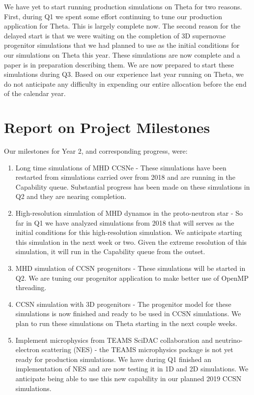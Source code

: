 \documentclass[12pt,titlepage]{article}
\begin{document}
We have yet to start running production simulations on Theta for two reasons. 
First, during Q1 we spent some effort continuing to tune our production application for Theta. 
This is largely complete now.
The second reason for the delayed start is that we were waiting on the completion of 3D supernovae progenitor simulations that we had planned to use as the initial conditions for our simulations on Theta this year.
These simulations are now complete and a paper is in preparation describing them. 
We are now prepared to start these simulations during Q3. 
Based on our experience last year running on Theta, we do not anticipate any difficulty in expending our entire allocation before the end of the calendar year.

\section{Report on Project Milestones}

Our milestones for Year 2, and corresponding progress, were:
\begin{enumerate}
    \item Long time simulations of MHD CCSNe - These simulations have been restarted from simulations carried over from 2018 and are running in the Capability queue. Substantial progress has been made on these simulations in Q2 and they are nearing completion.
    \item High-resolution simulation of MHD dynamos in the proto-neutron star - So far in Q1 we have analyzed simulations from 2018 that will serves as the initial conditions for this high-resolution simulation. We anticipate starting this simulation in the next week or two. Given the extreme resolution of this simulation, it will run in the Capability queue from the outset.
    \item MHD simulation of CCSN progenitors - These simulations will be started in Q2. We are tuning our progenitor application to make better use of OpenMP threading.
    \item CCSN simulation with 3D progenitors - The progenitor model for these simulations is now finished and ready to be used in CCSN simulations. We plan to run these simulations on Theta starting in the next couple weeks.
    \item Implement microphysics from TEAMS SciDAC collaboration and neutrino-electron scattering (NES) - the TEAMS microphysics package is not yet ready for production simulations. We have during Q1 finished an implementation of NES and are now testing it in 1D and 2D simulations. We anticipate being able to use this new capability in our planned 2019 CCSN simulations. 
\end{enumerate}
\end{document}
